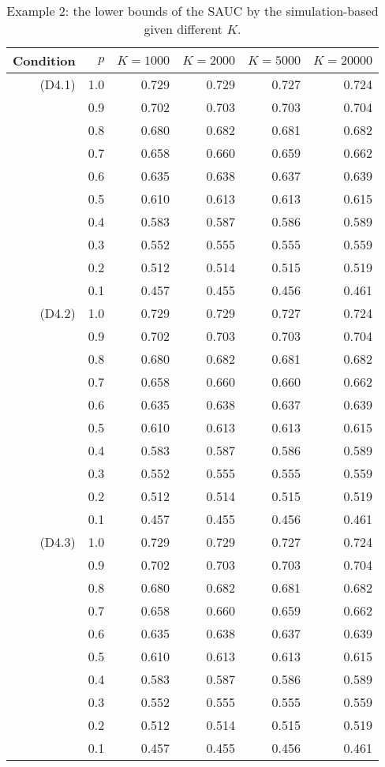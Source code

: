 \begin{table}

\caption{\label{tab:tab1}Example 2: the lower bounds of the SAUC by the simulation-based given different $K$.}
\centering
\begin{tabular}[t]{rrrrrr}
\toprule
Condition & $p$ & $K=1000$ & $K=2000$ & $K=5000$ & $K=20000$\\
\midrule
(D4.1) & 1.0 & 0.729 & 0.729 & 0.727 & 0.724\\
 & 0.9 & 0.702 & 0.703 & 0.703 & 0.704\\
 & 0.8 & 0.680 & 0.682 & 0.681 & 0.682\\
 & 0.7 & 0.658 & 0.660 & 0.659 & 0.662\\
 & 0.6 & 0.635 & 0.638 & 0.637 & 0.639\\
 & 0.5 & 0.610 & 0.613 & 0.613 & 0.615\\
 & 0.4 & 0.583 & 0.587 & 0.586 & 0.589\\
 & 0.3 & 0.552 & 0.555 & 0.555 & 0.559\\
 & 0.2 & 0.512 & 0.514 & 0.515 & 0.519\\
 & 0.1 & 0.457 & 0.455 & 0.456 & 0.461\\
(D4.2) & 1.0 & 0.729 & 0.729 & 0.727 & 0.724\\
 & 0.9 & 0.702 & 0.703 & 0.703 & 0.704\\
 & 0.8 & 0.680 & 0.682 & 0.681 & 0.682\\
 & 0.7 & 0.658 & 0.660 & 0.660 & 0.662\\
 & 0.6 & 0.635 & 0.638 & 0.637 & 0.639\\
 & 0.5 & 0.610 & 0.613 & 0.613 & 0.615\\
 & 0.4 & 0.583 & 0.587 & 0.586 & 0.589\\
 & 0.3 & 0.552 & 0.555 & 0.555 & 0.559\\
 & 0.2 & 0.512 & 0.514 & 0.515 & 0.519\\
 & 0.1 & 0.457 & 0.455 & 0.456 & 0.461\\
(D4.3) & 1.0 & 0.729 & 0.729 & 0.727 & 0.724\\
 & 0.9 & 0.702 & 0.703 & 0.703 & 0.704\\
 & 0.8 & 0.680 & 0.682 & 0.681 & 0.682\\
 & 0.7 & 0.658 & 0.660 & 0.659 & 0.662\\
 & 0.6 & 0.635 & 0.638 & 0.637 & 0.639\\
 & 0.5 & 0.610 & 0.613 & 0.613 & 0.615\\
 & 0.4 & 0.583 & 0.587 & 0.586 & 0.589\\
 & 0.3 & 0.552 & 0.555 & 0.555 & 0.559\\
 & 0.2 & 0.512 & 0.514 & 0.515 & 0.519\\
 & 0.1 & 0.457 & 0.455 & 0.456 & 0.461\\
\bottomrule
\end{tabular}
\end{table}
